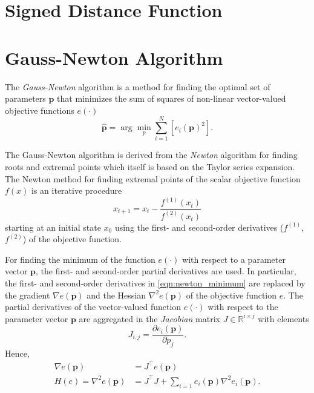 \section{Signed Distance Function}


\section{Gauss-Newton Algorithm}

The \textit{Gauss-Newton} algorithm is a method for finding the optimal set of parameters $\mathbf{p}$ that minimizes the sum of squares of non-linear vector-valued objective functions $e(\cdot)$
%
\begin{equation}
\hat{\mathbf{p}} = \arg\min_{p} \sum_{i=1}^N\left[ e_i(\mathbf{p})^2\right] .
\end{equation}

The Gauss-Newton algorithm is derived from the \textit{Newton} algorithm for finding roots and extremal points which itself is based on the Taylor series expansion. The Newton method for finding extremal points of the scalar objective function $f(x)$ is an iterative procedure
%
\begin{equation}
x_{t+1} = x_t - \frac{f^{(1)}(x_t)}{f^{(2)}(x_t)}
\label{eqn:newton_minimum}
\end{equation}
%
starting at an initial state $x_0$ using the first- and second-order derivatives ($f^{(1)}$, $f^{(2)}$) of the objective function.

For finding the minimum of the function $e(\cdot)$ with respect to a parameter vector $\mathbf{p}$, the first- and second-order partial derivatives are used. In particular, the first- and second-order derivatives in \ref{eqn:newton_minimum} are replaced by the gradient $\nabla e(\mathbf{p})$ and the Hessian $\nabla^2 e(\mathbf{p})$ of the objective function $e$.
The partial derivatives of the vector-valued function $e(\cdot)$ with respect to the parameter vector $\mathbf{p}$ are aggregated in the \textit{Jacobian} matrix $J\in \mathbb{R}^{i \times j}$ with elements
%
\begin{equation}
J_{i,j} = \frac{\partial e_i(\mathbf{p})}{\partial p_j} .
\end{equation}
%
Hence,
\begin{align}
\nabla e(\mathbf{p}) &= J^\top e(\mathbf{p}) \label{eqn:gn_gradient}\\
H(e) = \nabla^2 e(\mathbf{p}) &= J^\top J +  \sum_{i=1} e_i(\mathbf{p}) \nabla^2 e_i(\mathbf{p}) \label{eqn:gn_hessian_full}.
\end{align}

